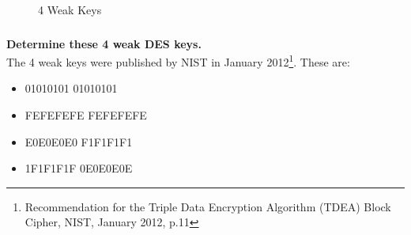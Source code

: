 \documentclass[11pt]{article}
\begin{document}
\newpage
\begin{figure}[ht!]
  \centering
  \quad
  \caption{4 Weak Keys}
  \label{fig:Weak keys}
\end{figure}

\subsubsection{}\textbf{Determine these 4 weak DES keys.}\\

The 4 weak keys were published by NIST in January 2012\footnote{Recommendation for the Triple Data Encryption Algorithm (TDEA)
Block Cipher, NIST, January 2012, p.11}. These are:\\
\begin{itemize}
  \item 01010101 01010101
  \item FEFEFEFE FEFEFEFE
  \item E0E0E0E0 F1F1F1F1
  \item 1F1F1F1F 0E0E0E0E
\end{itemize}
\end{document}
